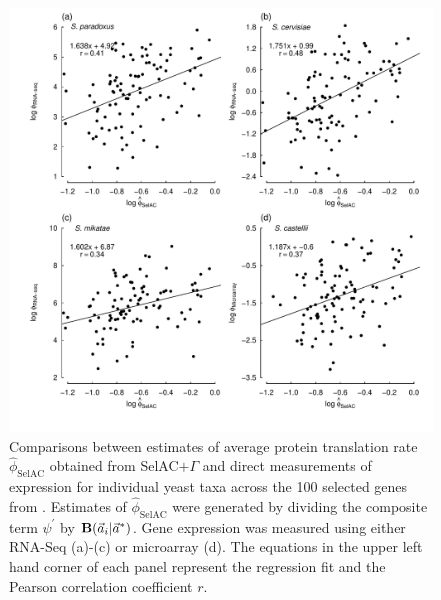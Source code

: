 \documentclass[12pt,letterpaper,fleqn]{article}
\newcommand{\Funcaveci}{\ensuremath{\Func(\aveci|\aoptvec)}\xspace}
\newcommand{\Func}{\ensuremath{\text{\textbf{B}}}\xspace}
\newcommand{\selac}{SelAC\xspace}
\newcommand{\selacplusgamma}{SelAC$+\Gamma$\xspace}
\newcommand{\aoptvec}{\ensuremath{\Vec{a}^*}\xspace}
\newcommand{\aveci}{\ensuremath{\Vec{a}_i}\xspace}
\newcommand{\phihat}{\ensuremath{\hat{\phi}_{\text{\selac}}}\xspace}
\newcommand{\psiprime}{\ensuremath{\psi^\prime}\xspace}
\begin{document}
\begin{figure}[H]
  \centering
  \includegraphics[width=0.9\linewidth]{FIGURE_1_SelACwG_vs_Empirical_by_spp.pdf}
  \caption{Comparisons between estimates of average protein translation rate $\phihat$ obtained from \selacplusgamma and direct measurements of expression for individual yeast taxa across the 100 selected genes from \citet{SalichosAndRokas2013}.
        Estimates of $\phihat$ were generated by dividing the composite term $\psiprime$ by \Funcaveci.
        Gene expression was measured using either RNA-Seq (a)-(c) or microarray (d). The equations in the upper left hand corner of each panel represent the regression fit and the Pearson correlation coefficient $r$.
  }
  \label{fig:PhivsEmpirical}
\end{figure}
\end{document}
